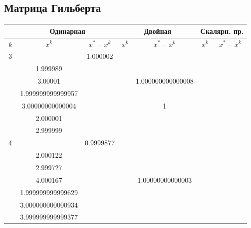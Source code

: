\documentclass[oneside, final, 12pt]{extarticle}
\begin{document}
\subsection{Матрица Гильберта}
\begin{longtable}{|c|c|c|c|c|c|c|} \hline
    \( \begin{aligned}  \end{aligned} \) & \multicolumn{2}{|c|}{Одинарная} & \multicolumn{2}{|c|}{Двойная} & \multicolumn{2}{|c|}{Скалярн. пр.} \\ \hline
    \(k\) & \(x^k\) & \(x^*-x^k\) & \(x^k\) & \(x^*-x^k\) & \(x^k\) & \(x^*-x^k\) \\ \hline
    \(3\) & \( \begin{aligned}
& 1.000002 \\ & 1.999989 \\ & 3.00001 
\end{aligned} \)
& \( \begin{aligned}  \end{aligned} \) 
& \( \begin{aligned}
& 1.000000000000008 \\ & 1.999999999999957 \\ & 3.00000000000004 
\end{aligned} \)
& \( \begin{aligned}  \end{aligned} \) 
& \( \begin{aligned}
& 1 \\ & 2.000001 \\ & 2.999999 
\end{aligned} \)
& \( \begin{aligned}  \end{aligned} \) 
\\ \hline
    \(4\) & \( \begin{aligned}
& 0.9999877 \\ & 2.000122 \\ & 2.999727 \\ & 4.000167 
\end{aligned} \)
& \( \begin{aligned}  \end{aligned} \) 
& \( \begin{aligned}
& 1.00000000000003 \\ & 1.999999999999629 \\ & 3.000000000000934 \\ & 3.999999999999377 
\end{aligned} \)
& \( \begin{aligned}  \end{aligned} \) 

\end{longtable}
\end{document}
